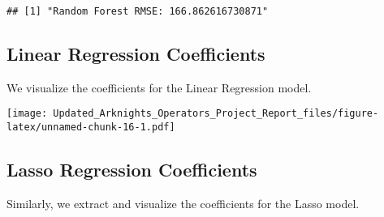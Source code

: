 \documentclass[
]{article}
\newenvironment{Shaded}{\begin{snugshade}}{\end{snugshade}}
\newcommand{\AttributeTok}[1]{\textcolor[rgb]{0.13,0.29,0.53}{#1}}
\newcommand{\CommentTok}[1]{\textcolor[rgb]{0.56,0.35,0.01}{\textit{#1}}}
\newcommand{\FunctionTok}[1]{\textcolor[rgb]{0.13,0.29,0.53}{\textbf{#1}}}
\newcommand{\NormalTok}[1]{#1}
\newcommand{\OtherTok}[1]{\textcolor[rgb]{0.56,0.35,0.01}{#1}}
\newcommand{\SpecialCharTok}[1]{\textcolor[rgb]{0.81,0.36,0.00}{\textbf{#1}}}
\newcommand{\StringTok}[1]{\textcolor[rgb]{0.31,0.60,0.02}{#1}}
\begin{document}
\begin{verbatim}
## [1] "Random Forest RMSE: 166.862616730871"
\end{verbatim}

\subsection{Linear Regression
Coefficients}\label{linear-regression-coefficients}

We visualize the coefficients for the Linear Regression model.

\begin{Shaded}
\end{Shaded}

\texttt{[image: Updated\_Arknights\_Operators\_Project\_Report\_files/figure-latex/unnamed-chunk-16-1.pdf]}

\subsection{Lasso Regression
Coefficients}\label{lasso-regression-coefficients}

Similarly, we extract and visualize the coefficients for the Lasso
model.
\end{document}
